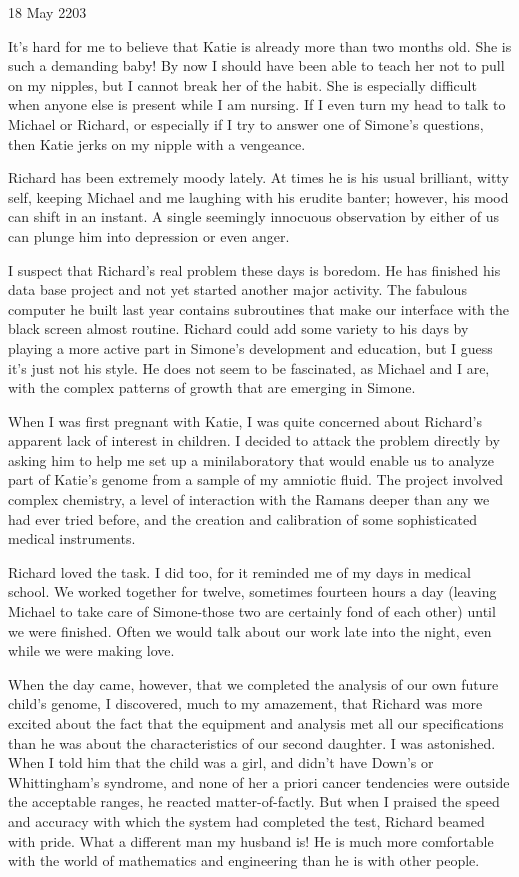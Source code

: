 \documentclass[]{article}
\begin{document}
18 May 2203

It’s hard for me to believe that Katie is already more than two months old. She is such a demanding baby! By now I should have been able to teach her not to pull on my nipples, but I cannot break her of the habit. She is especially difficult when anyone else is present while I am nursing. If I even turn my head to talk to Michael or Richard, or especially if I try to answer one of Simone’s questions, then Katie jerks on my nipple with a vengeance.

Richard has been extremely moody lately. At times he is his usual brilliant, witty self, keeping Michael and me laughing with his erudite banter; however, his mood can shift in an instant. A single seemingly innocuous observation by either of us can plunge him into depression or even anger.

I suspect that Richard’s real problem these days is boredom. He has finished his data base project and not yet started another major activity. The fabulous computer he built last year contains subroutines that make our interface with the black screen almost routine. Richard could add some variety to his days by playing a more active part in Simone’s development and education, but I guess it’s just not his style. He does not seem to be fascinated, as Michael and I are, with the complex patterns of growth that are emerging in Simone.

When I was first pregnant with Katie, I was quite concerned about Richard’s apparent lack of interest in children. I decided to attack the problem directly by asking him to help me set up a minilaboratory that would enable us to analyze part of Katie’s genome from a sample of my amniotic fluid. The project involved complex chemistry, a level of interaction with the Ramans deeper than any we had ever tried before, and the creation and calibration of some sophisticated medical instruments.

Richard loved the task. I did too, for it reminded me of my days in medical school. We worked together for twelve, sometimes fourteen hours a day (leaving Michael to take care of Simone-those two are certainly fond of each other) until we were finished. Often we would talk about our work late into the night, even while we were making love.

When the day came, however, that we completed the analysis of our own future child’s genome, I discovered, much to my amazement, that Richard was more excited about the fact that the equipment and analysis met all our specifications than he was about the characteristics of our second daughter. I was astonished. When I told him that the child was a girl, and didn’t have Down’s or Whittingham’s syndrome, and none of her a priori cancer tendencies were outside the acceptable ranges, he reacted matter-of-factly. But when I praised the speed and accuracy with which the system had completed the test, Richard beamed with pride. What a different man my husband is! He is much more comfortable with the world of mathematics and engineering than he is with other people.
\end{document}
